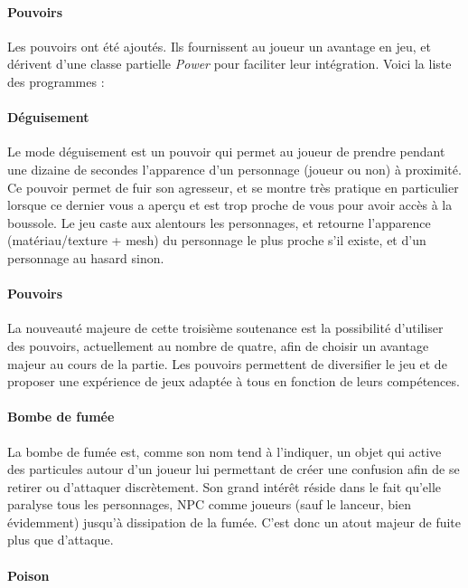 		\paragraph{Pouvoirs}

			Les pouvoirs ont été ajoutés. Ils fournissent au joueur un avantage en jeu, et dérivent d'une classe partielle \textit{Power} 
			pour faciliter leur intégration. Voici la liste des programmes : 

		\paragraph{Déguisement}

			Le mode déguisement est un pouvoir qui permet au joueur de prendre pendant une dizaine de secondes l'apparence 
			d'un personnage (joueur ou non) à proximité. Ce pouvoir permet de fuir son agresseur, et se montre très pratique 
			en particulier lorsque ce dernier vous a aperçu et est trop proche de vous pour avoir accès à la boussole. 
			Le jeu caste aux alentours les personnages, et retourne l'apparence (matériau/texture + mesh) du 
			personnage le plus proche s'il existe, et d'un personnage au hasard sinon.

		\paragraph{Pouvoirs}

			La nouveauté majeure de cette troisième soutenance est la possibilité d'utiliser des pouvoirs, actuellement au 
			nombre de quatre, afin de choisir un avantage majeur au cours de la partie. Les pouvoirs permettent de diversifier 
			le jeu et de proposer une expérience de jeux adaptée à tous en fonction de leurs compétences.

		\paragraph{Bombe de fumée}

			La bombe de fumée est, comme son nom tend à l'indiquer, un objet qui active des particules autour d'un joueur lui 
			permettant de créer une confusion afin de se retirer ou d'attaquer discrètement. Son grand intérêt réside dans le fait 
			qu'elle paralyse tous les personnages, NPC comme joueurs (sauf le lanceur, bien évidemment) jusqu'à dissipation de la fumée. 
			C'est donc un atout majeur de fuite plus que d'attaque.

		\paragraph{Poison}

